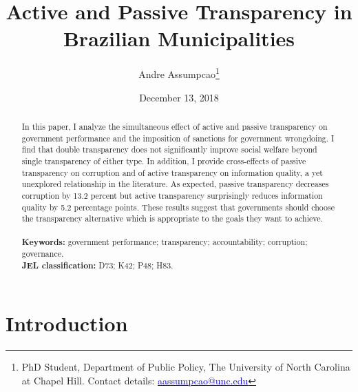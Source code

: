\documentclass[11pt]{article}
\begin{document}
\begin{titlepage}
\title{Active and Passive Transparency in Brazilian Municipalities}
\author{Andre Assumpcao\thanks{PhD Student, Department of Public Policy, The University of North Carolina at Chapel Hill. Contact details: \href{mailto:aassumpcao@unc.edu}{\textcolor{blue}{aassumpcao@unc.edu}}}}
\date{December 13, 2018}

\maketitle

\begin{abstract}
\noindent In this paper, I analyze the simultaneous effect of active and passive transparency on government performance and the imposition of sanctions for government wrongdoing. I find that double transparency does not significantly improve social welfare beyond single transparency of either type. In addition, I provide cross-effects of passive transparency on corruption and of active transparency on information quality, a yet unexplored relationship in the literature. As expected, passive transparency decreases corruption by 13.2 percent but active transparency surprisingly reduces information quality by 5.2 percentage points. These results suggest that governments should choose the transparency alternative which is appropriate to the goals they want to achieve. \\
\vspace{0in} \\
\noindent\textbf{Keywords:} government performance; transparency; accountability; corruption; governance. \\

\noindent\textbf{JEL classification:} D73; K42; P48; H83. \\

\vspace{0in}
\bigskip

\end{abstract}

\setcounter{page}{0}

\thispagestyle{empty}

\end{titlepage}

\clearpage

\section{Introduction} \label{sec:introduction_paper3}
\end{document}
